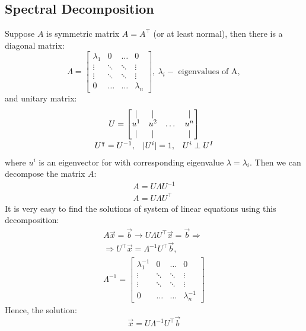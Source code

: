 \subsection*{Spectral Decomposition}
Suppose $A$ is symmetric matrix $A = A^\intercal$ (or at least normal), then there is a diagonal matrix:
\[
        \Lambda = \begin{bmatrix}
            \lambda_1 & 0 & \ldots & 0\\
            \vdots & \ddots &\ddots & \vdots\\
            \vdots & \ddots &\ddots & \vdots\\
            0 & \ldots & \ldots & \lambda_n
        \end{bmatrix}, \ \lambda_i - \text{ eigenvalues of A},
\]
and unitary matrix:
\[
    \begin{array}{c}
        U = \begin{bmatrix}
            | & | & \ & | \\
            u^{1} & u^{2} & \dots & u^{n} \\
            | & | & \ & |
        \end{bmatrix}    \\[0.5cm]
        U^\intercal = U^{-1}, \hspace*{3mm} |U^i| = 1, \hspace*{3mm} U^i \perp U^I    
    \end{array}
\]
where $u^i$ is an eigenvector for with corresponding eigenvalue $\lambda = \lambda_i$. Then we can decompose the matrix $A$:
\[
    \begin{array}{c}
        A = U \Lambda U^{-1}\\
        A = U \Lambda U^\intercal
    \end{array}  
\]
It is very easy to find the solutions of system of linear equations using this decomposition:
\[
    \begin{array}{c}
        A\vec{x} = \vec{b} \rightarrow U\Lambda U^\intercal \vec{x} = \vec{b} \Longrightarrow \\
        \Rightarrow U^\intercal \vec{x} = \Lambda^{-1} U^\intercal \vec{b}, \\[0.5cm]
        \Lambda^{-1} = \begin{bmatrix}
            \lambda_1^{-1} & 0 & \ldots & 0\\
            \vdots & \ddots &\ddots & \vdots\\
            \vdots & \ddots &\ddots & \vdots\\
            0 & \ldots & \ldots & \lambda_n^{-1}
        \end{bmatrix}
    \end{array}
\]
Hence, the solution:
\[
    \vec{x} = U\Lambda^{-1} U^\intercal \vec{b}  
\]
\newpage
